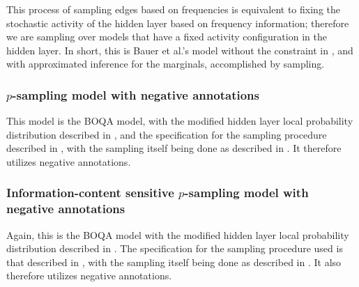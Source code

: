 This process of sampling edges based on frequencies is equivalent to
fixing the stochastic activity of the hidden layer based on
frequency information;
%
therefore we are sampling over models that have a fixed activity configuration in the
hidden layer.
%
In short, this is Bauer et al.'s model without the constraint in
, and with approximated inference for the
marginals, accomplished by sampling.

\subsubsection{$p$-sampling model with negative annotations}
\label{subsubsec:psampexp}
%
This model is the BOQA model, with the modified hidden layer local probability
distribution described in , and the specification for the
sampling procedure described in ,
with the sampling itself being done as described in .
%
It therefore utilizes negative annotations.

\subsubsection{Information-content sensitive $p$-sampling model with negative
annotations}
\label{subsubsec:icpsampexp}
%
Again, this is the BOQA model with the modified hidden layer local probability
distribution described in . The specification for the sampling
procedure used is that described in ,
with the sampling itself being done as described in .
%
It also therefore utilizes negative annotations.
